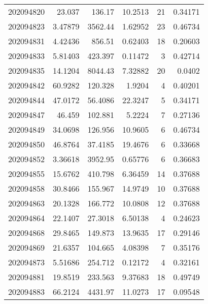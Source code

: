 \begin{tabular}{rrrrrr}
 202094820 &         23.037   &      136.17   &           10.2513  &          21 & 0.34171 \\
 202094823 &          3.47879 &     3562.44   &            1.62952 &          23 & 0.46734 \\
 202094831 &          4.42436 &      856.51   &            0.62403 &          18 & 0.20603 \\
 202094833 &          5.81403 &      423.397  &            0.11472 &           3 & 0.42714 \\
 202094835 &         14.1204  &     8044.43   &            7.32882 &          20 & 0.0402  \\
 202094842 &         60.9282  &      120.328  &            1.9204  &           4 & 0.40201 \\
 202094844 &         47.0172  &       56.4086 &           22.3247  &           5 & 0.34171 \\
 202094847 &         46.459   &      102.881  &            5.2224  &           7 & 0.27136 \\
 202094849 &         34.0698  &      126.956  &           10.9605  &           6 & 0.46734 \\
 202094850 &         46.8764  &       37.4185 &           19.4676  &           6 & 0.33668 \\
 202094852 &          3.36618 &     3952.95   &            0.65776 &           6 & 0.36683 \\
 202094855 &         15.6762  &      410.798  &            6.36459 &          14 & 0.37688 \\
 202094858 &         30.8466  &      155.967  &           14.9749  &          10 & 0.37688 \\
 202094863 &         20.1328  &      166.772  &           10.0808  &          12 & 0.37688 \\
 202094864 &         22.1407  &       27.3018 &            6.50138 &           4 & 0.24623 \\
 202094868 &         29.8465  &      149.873  &           13.9635  &          17 & 0.29146 \\
 202094869 &         21.6357  &      104.665  &            4.08398 &           7 & 0.35176 \\
 202094873 &          5.51686 &      254.712  &            0.12172 &           4 & 0.32161 \\
 202094881 &         19.8519  &      233.563  &            9.37683 &          18 & 0.49749 \\
 202094883 &         66.2124  &     4431.97   &           11.0273  &          17 & 0.09548 \\

\end{tabular}
